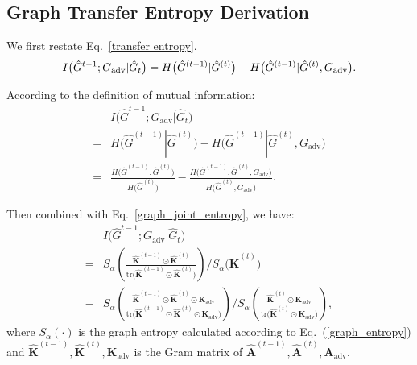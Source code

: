 
\subsection{Graph Transfer Entropy Derivation}
\label{appendix:derivation}
We first restate Eq.~\eqref{transfer entropy}.
\begin{equation}
    I\big(\hat{G}^{t-1}; G_{\text{adv}}| \hat{G}_{t}\big) = 
    H\big(\hat{G}^{(t-1)}|\hat{G}^{(t)}\big) - H\big(\hat{G}^{(t-1)}|\hat{G}^{(t)}, G_{\text{adv}}\big).\notag
\end{equation}

According to the definition of mutual information:
\begin{align}
    &I\big(\hat{G}^{t-1}; G_{\text{adv}}| \hat{G}_{t}\big) \\
    = &
    H\big(\hat{G}^{(t-1)}|\hat{G}^{(t)}\big) - H\big(\hat{G}^{(t-1)}|\hat{G}^{(t)}, G_{\text{adv}}\big) \\
    = &
    \frac{H\big(\hat{G}^{(t-1)},\hat{G}^{(t)}\big)}{H\big(\hat{G}^{(t)}\big)} - \frac{H\big(\hat{G}^{(t-1)}, \hat{G}^{(t)}, G_{\text{adv}}\big)}{H\big(\hat{G}^{(t)}, G_{\text{adv}}\big)}.
\end{align}

Then combined with Eq.~\eqref{graph_joint_entropy}, we have:
\begin{align}
    &I\big(\hat{G}^{t-1}; G_{\text{adv}}| \hat{G}_{t}\big) \\
    = &
    S_{\alpha}\left(\frac{\hat{\mathbf{K}}^{(t-1)}\odot \hat{\mathbf{K}}^{(t)}}{\mathrm{tr}\big(\hat{\mathbf{K}}^{(t-1)}\odot \hat{\mathbf{K}}^{(t)}\big)}\right) / S_\alpha\big(\hat{\mathbf{K}}^{(t)}\big) \\
       -&  S_{\alpha}\left(\frac{\hat{\mathbf{K}}^{(t-1)}\odot \hat{\mathbf{K}}^{(t)} \odot \mathbf{K}_{\text{adv}}}{\mathrm{tr}\big(\hat{\mathbf{K}}^{(t-1)}\odot \hat{\mathbf{K}}^{(t)} \odot \mathbf{K}_{\text{adv}}\big) }\right) / S_\alpha\left(\frac{\hat{\mathbf{K}}^{(t)} \odot \mathbf{K}_{\text{adv}}}{\mathrm{tr}\big(\hat{\mathbf{K}}^{(t)} \odot \mathbf{K}_{\text{adv}}\big)}\right),
\end{align}
where $S_\alpha(\cdot)$ is the graph entropy calculated according to Eq.~(\ref{graph_entropy}) and $\hat{\mathbf{K}}^{(t-1)}, \hat{\mathbf{K}}^{(t)}, \mathbf{K}_{\text{adv}}$ is the Gram matrix of $\hat{\mathbf{A}}^{(t-1)}, \hat{\mathbf{A}}^{(t)}, \mathbf{A}_{\text{adv}}$.



